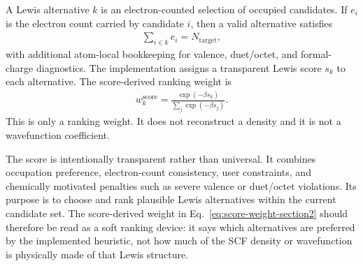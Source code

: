 \documentclass[11pt]{article}
\begin{document}
A Lewis alternative $k$ is an electron-counted selection of occupied candidates.  If $e_i$ is the electron count carried by candidate $i$, then a valid alternative satisfies
\begin{equation}
\begin{aligned}
	\sum_{i\in k} e_i = N_{\mathrm{target}},
\end{aligned}
\end{equation}
with additional atom-local bookkeeping for valence, duet/octet, and formal-charge diagnostics.  The implementation assigns a transparent Lewis score $s_k$ to each alternative.  The score-derived ranking weight is
\begin{align}
	w^{\mathrm{score}}_k
	= \frac{\exp(-\beta s_k)}{\sum_j \exp(-\beta s_j)}.
	\label{eq:score-weight-section2}
\end{align}
This is only a ranking weight.  It does not reconstruct a density and it is not a wavefunction coefficient.

The score is intentionally transparent rather than universal.  It combines occupation preference, electron-count consistency, user constraints, and chemically motivated penalties such as severe valence or duet/octet violations.  Its purpose is to choose and rank plausible Lewis alternatives within the current candidate set.  The score-derived weight in Eq.~\eqref{eq:score-weight-section2} should therefore be read as a soft ranking device: it says which alternatives are preferred by the implemented heuristic, not how much of the SCF density or wavefunction is physically made of that Lewis structure.
\end{document}
